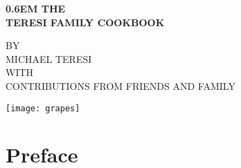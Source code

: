 \documentclass{family_cookbook}
\begin{document}
\frontmatter
{}

\begin{titlepage}


\onecolumn
\pagestyle{empty}
\newcommand\nbvspace[1][3]{\vspace*{\stretch{#1}}}
\newcommand\nbstretchyspace{\spaceskip0.5em plus 0.25em minus 0.25em}
\newcommand{\nbtitlestretch}{\spaceskip0.6em}

{%
	\centering
	\bfseries
	\uppercase{%
		\nbtitlestretch%
		\large{the}\\ \vspace{1em}
		\Huge{teresi family cookbook}
	}
	\nbvspace[1]

	\large{BY}\\
	\vspace{1ex}
	\Large{MICHAEL TERESI}\\
	\nbvspace[1]
	\small{WITH}\\
	\vspace{1ex}
	\small{CONTRIBUTIONS FROM FRIENDS AND FAMILY}\\
	\nbvspace[1]

	\texttt{[image: grapes]}
	\vfill


}
\end{titlepage}
\restoregeometry

\dominitoc%
\nomtcrule%


\tableofcontents


\chapter*{Preface}


\clearpage
\end{document}
